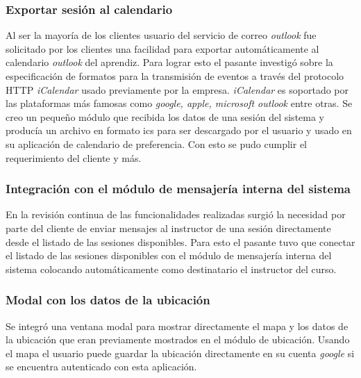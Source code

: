 \subsubsection{Exportar sesión al calendario}

Al ser la mayoría de los clientes usuario del servicio de correo \emph{outlook} fue solicitado por los clientes una facilidad para exportar automáticamente al calendario \emph{outlook} del aprendiz. Para lograr esto el pasante investigó sobre la especificación de formatos para la transmisión de eventos a través del protocolo HTTP \emph{iCalendar} usado previamente por la empresa. \emph{iCalendar} es soportado por las plataformas más famosas como \emph{google, apple, microsoft outlook} entre otras. Se creo un pequeño módulo que recibida los datos de una sesión del sistema y producía un archivo en formato ics para ser descargado por el usuario y usado en su aplicación de calendario de preferencia. Con esto se pudo cumplir el requerimiento del cliente y más.

\subsubsection{Integración con el módulo de mensajería interna del sistema}

En la revisión continua de las funcionalidades realizadas surgió la necesidad por parte del cliente de enviar mensajes al instructor de una sesión directamente desde el listado de las sesiones disponibles. Para esto el pasante tuvo que conectar el listado de las sesiones disponibles con el módulo de mensajería interna del sistema colocando automáticamente como destinatario el instructor del curso.

\subsubsection{Modal con los datos de la ubicación}

Se integró una ventana modal para mostrar directamente el mapa y los datos de la ubicación que eran previamente mostrados en el módulo de ubicación. Usando el mapa el usuario puede guardar la ubicación directamente en su cuenta \emph{google} si se encuentra autenticado con esta aplicación.






